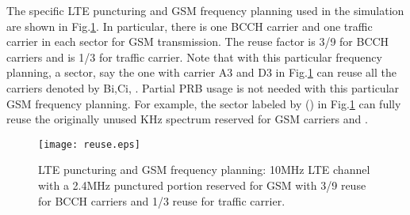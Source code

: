 \documentclass[10pt,journal]{IEEEtran}
\theoremstyle{slplain}
\begin{document}
The specific LTE puncturing and GSM frequency planning used in the simulation are shown in Fig.\ref{fig:reuse}. In particular, there is one BCCH carrier and one traffic carrier in each sector for GSM transmission. The reuse factor is 3/9 for BCCH carriers and is 1/3 for traffic carrier. Note that with this particular frequency planning, a sector, say the one with carrier A3 and D3 in Fig.\ref{fig:reuse} can reuse all the carriers denoted by Bi,Ci, . Partial PRB usage is not needed with this particular GSM frequency planning. For example, the sector labeled by () in Fig.\ref{fig:reuse} can fully reuse the originally unused KHz spectrum reserved for GSM carriers  and .


\begin{figure}
\centering
\texttt{[image: reuse.eps]}
\caption{LTE puncturing and GSM frequency planning: 10MHz LTE channel with a 2.4MHz punctured portion reserved for GSM with 3/9 reuse for BCCH carriers and 1/3 reuse for traffic carrier.}
\label{fig:reuse}
\end{figure}
\end{document}
